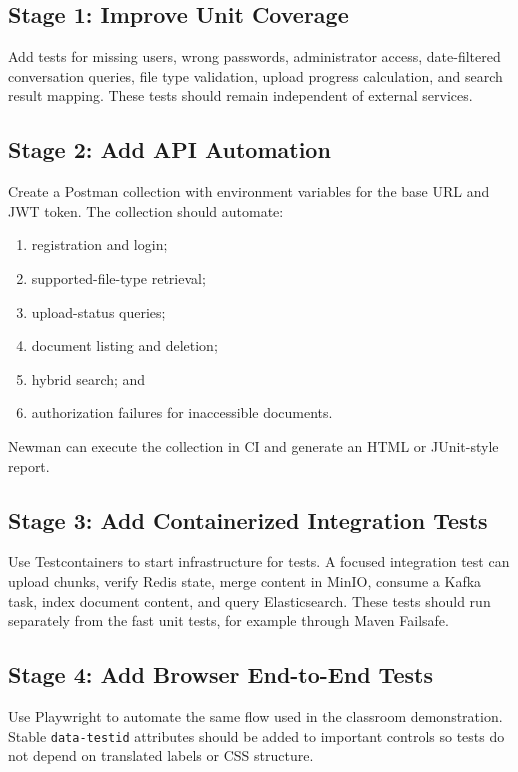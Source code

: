 \documentclass[11pt,a4paper]{article}
\begin{document}
\subsection{Stage 1: Improve Unit Coverage}

Add tests for missing users, wrong passwords, administrator access, date-filtered
conversation queries, file type validation, upload progress calculation, and search
result mapping. These tests should remain independent of external services.

\subsection{Stage 2: Add API Automation}

Create a Postman collection with environment variables for the base URL and JWT token.
The collection should automate:
\begin{enumerate}[leftmargin=2em]
  \item registration and login;
  \item supported-file-type retrieval;
  \item upload-status queries;
  \item document listing and deletion;
  \item hybrid search; and
  \item authorization failures for inaccessible documents.
\end{enumerate}

Newman can execute the collection in CI and generate an HTML or JUnit-style report.

\subsection{Stage 3: Add Containerized Integration Tests}

Use Testcontainers to start infrastructure for tests. A focused integration test can
upload chunks, verify Redis state, merge content in MinIO, consume a Kafka task, index
document content, and query Elasticsearch. These tests should run separately from the
fast unit tests, for example through Maven Failsafe.

\subsection{Stage 4: Add Browser End-to-End Tests}

Use Playwright to automate the same flow used in the classroom demonstration. Stable
\texttt{data-testid} attributes should be added to important controls so tests do not
depend on translated labels or CSS structure.
\end{document}
